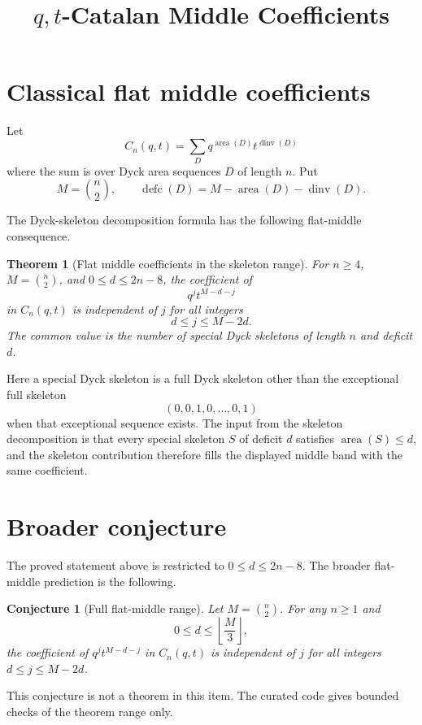 \documentclass{article}
\title{$q,t$-Catalan Middle Coefficients}
\author{}
\date{}
\newtheorem{theorem}{Theorem}
\newtheorem{conjecture}{Conjecture}
\begin{document}
\maketitle

\section{Classical flat middle coefficients}

Let
\[
  C_n(q,t)=\sum_D q^{\operatorname{area}(D)}t^{\operatorname{dinv}(D)}
\]
where the sum is over Dyck area sequences \(D\) of length \(n\).  Put
\[
  M=\binom{n}{2}, \qquad
  \operatorname{defc}(D)=M-\operatorname{area}(D)-\operatorname{dinv}(D).
\]

The Dyck-skeleton decomposition formula has the following flat-middle
consequence.

\begin{theorem}[Flat middle coefficients in the skeleton range]
For \(n\ge 4\), \(M=\binom{n}{2}\), and \(0\le d\le 2n-8\), the coefficient of
\[
  q^j t^{M-d-j}
\]
in \(C_n(q,t)\) is independent of \(j\) for all integers
\[
  d\le j\le M-2d.
\]
The common value is the number of special Dyck skeletons of length \(n\) and
deficit \(d\).
\end{theorem}

Here a special Dyck skeleton is a full Dyck skeleton other than the exceptional
full skeleton
\[
  (0,0,1,0,\ldots,0,1)
\]
when that exceptional sequence exists.  The input from the skeleton
decomposition is that every special skeleton \(S\) of deficit \(d\) satisfies
\(\operatorname{area}(S)\le d\), and the skeleton contribution therefore fills
the displayed middle band with the same coefficient.

\section{Broader conjecture}

The proved statement above is restricted to \(0\le d\le 2n-8\).  The broader
flat-middle prediction is the following.

\begin{conjecture}[Full flat-middle range]
Let \(M=\binom{n}{2}\).  For any \(n\ge 1\) and
\[
  0\le d\le \left\lfloor \frac{M}{3}\right\rfloor,
\]
the coefficient of \(q^j t^{M-d-j}\) in \(C_n(q,t)\) is independent of \(j\)
for all integers \(d\le j\le M-2d\).
\end{conjecture}

This conjecture is not a theorem in this item.  The curated code gives bounded
checks of the theorem range only.
\end{document}
